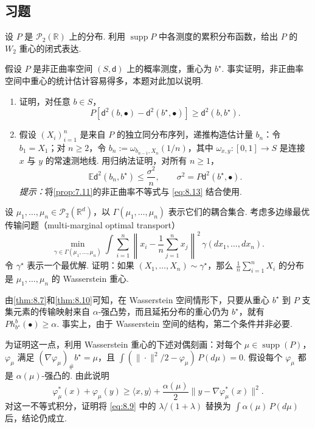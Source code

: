 \subsection{习题}\label{sec:8.5}
\begin{exercise}\label{exer:8.1}
设 $P$ 是 $\mathcal P_2(\mathbb R)$ 上的分布. 利用 $\operatorname{supp}P$ 中各测度的累积分布函数，给出 $P$ 的 $W_2$ 重心的闭式表达.
\end{exercise}

\begin{exercise}\label{exer:8.2}
假设 $P$ 是非正曲率空间 $(S,\mathsf d)$ 上的概率测度，重心为 $b^\star$. 事实证明，非正曲率空间中重心的统计估计容易得多，本题对此加以说明.
\begin{enumerate}\renewcommand{\labelenumi}{(\alph{enumi})}
\item 证明，对任意 $b\in S$，
\begin{equation}\label{eq:8.13}
P[\mathsf d^2(b,\bullet)-\mathsf d^2(b^\star,\bullet)]\ge\mathsf d^2(b,b^\star).
\end{equation}
\item 假设 $(X_i)_{i=1}^n$ 是来自 $P$ 的独立同分布序列，递推构造估计量 $b_n$：令 $b_1=X_1$；对 $n\ge2$，令 $b_n:=\omega_{b_{n-1},X_n}(1/n)$，其中 $\omega_{x,y}:[0,1]\to S$ 是连接 $x$ 与 $y$ 的常速测地线. 用归纳法证明，对所有 $n\ge1$，
$$\mathbb E\mathsf d^2(b_n,b^\star)\le\frac{\sigma^2}n,
\qquad\sigma^2=P\mathsf d^2(b^\star,\bullet).$$
\emph{提示：}将\autoref{prop:7.11}的非正曲率不等式与 \eqref{eq:8.13} 结合使用.
\end{enumerate}
\end{exercise}

\begin{exercise}\label{exer:8.3}
设 $\mu_1,\ldots,\mu_n\in\mathcal P_2(\mathbb R^d)$，以 $\Gamma(\mu_1,\ldots,\mu_n)$ 表示它们的耦合集合. 考虑多边缘最优传输问题（multi-marginal optimal transport）
$$\min_{\gamma\in\Gamma(\mu_1,\ldots,\mu_n)}
\int\sum_{i=1}^n\left\|x_i-\frac1n\sum_{j=1}^n x_j\right\|^2\,\gamma(dx_1,\ldots,dx_n).$$
令 $\gamma^\star$ 表示一个最优解. 证明：如果 $(X_1,\ldots,X_n)\sim\gamma^\star$，那么 $\frac1n\sum_{i=1}^n X_i$ 的分布是 $\mu_1,\ldots,\mu_n$ 的 Wasserstein 重心.
\end{exercise}

\begin{exercise}\label{exer:8.4}
由\autoref{thm:8.7}和\autoref{thm:8.10}可知，在 Wasserstein 空间情形下，只要从重心 $b^\star$ 到 $P$ 支集元素的传输映射来自 $\alpha$-强凸势，而且延拓分布的重心仍为 $b^\star$，就有 $Ph_{b^\star}^b(\bullet)\ge\alpha$. 事实上，由于 Wasserstein 空间的结构，第二个条件并非必要.

为证明这一点，利用 Wasserstein 重心的下述对偶刻画：对每个 $\mu\in\operatorname{supp}(P)$，$\varphi_\mu$ 满足 $(\nabla\varphi_\mu)_\#b^\star=\mu$，且 $\int(\|\cdot\|^2/2-\varphi_\mu)\,P(d\mu)=0$. 假设每个 $\varphi_\mu$ 都是 $\alpha(\mu)$-强凸的. 由此说明
$$\varphi_\mu^*(x)+\varphi_\mu(y)\ge\langle x,y\rangle
+\frac{\alpha(\mu)}2\|y-\nabla\varphi_\mu^*(x)\|^2.$$
对这一不等式积分，证明将 \eqref{eq:8.9} 中的 $\lambda/(1+\lambda)$ 替换为 $\int\alpha(\mu)\,P(d\mu)$ 后，结论仍成立.
\end{exercise}

